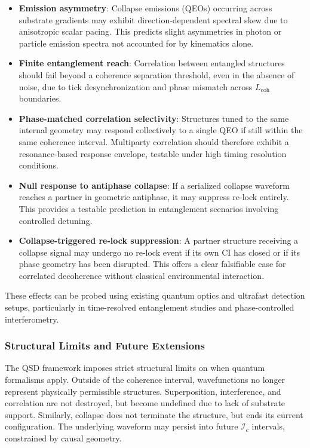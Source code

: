\documentclass[entropy,article,submit,pdftex,moreauthors]{Definitions/mdpi}
\begin{document}
\begin{itemize}
  \item \textbf{Emission asymmetry}: Collapse emissions (QEOs) occurring across substrate gradients may exhibit direction-dependent spectral skew due to anisotropic scalar pacing. This predicts slight asymmetries in photon or particle emission spectra not accounted for by kinematics alone.
  
  \item \textbf{Finite entanglement reach}: Correlation between entangled structures should fail beyond a coherence separation threshold, even in the absence of noise, due to tick desynchronization and phase mismatch across \( L_{\text{coh}} \) boundaries.
  
  \item \textbf{Phase-matched correlation selectivity}: Structures tuned to the same internal geometry may respond collectively to a single QEO if still within the same coherence interval. Multiparty correlation should therefore exhibit a resonance-based response envelope, testable under high timing resolution conditions.
  
  \item \textbf{Null response to antiphase collapse}: If a serialized collapse waveform reaches a partner in geometric antiphase, it may suppress re-lock entirely. This provides a testable prediction in entanglement scenarios involving controlled detuning.
  
  \item \textbf{Collapse-triggered re-lock suppression}: A partner structure receiving a collapse signal may undergo no re-lock event if its own CI has closed or if its phase geometry has been disrupted. This offers a clear falsifiable case for correlated decoherence without classical environmental interaction.
\end{itemize}

These effects can be probed using existing quantum optics and ultrafast detection setups, particularly in time-resolved entanglement studies and phase-controlled interferometry.

\subsubsection{Structural Limits and Future Extensions}

The QSD framework imposes strict structural limits on when quantum formalisms apply. Outside of the coherence interval, wavefunctions no longer represent physically permissible structures. Superposition, interference, and correlation are not destroyed, but become undefined due to lack of substrate support. Similarly, collapse does not terminate the structure, but ends its current configuration. The underlying waveform may persist into future \( \mathcal{I}_c \) intervals, constrained by causal geometry.
\end{document}
